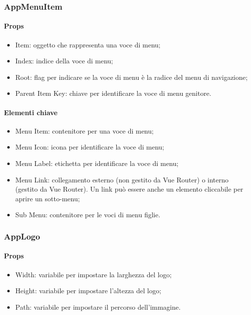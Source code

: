 \subsubsection{AppMenuItem}

\paragraph*{Props}
\begin{itemize}
  \item Item: oggetto che rappresenta una voce di menu;
  \item Index: indice della voce di menu;
  \item Root: flag per indicare se la voce di menu è la radice del menu di navigazione;
  \item Parent Item Key: chiave per identificare la voce di menu genitore.
\end{itemize}

\paragraph*{Elementi chiave}
\begin{itemize}
  \item Menu Item: contenitore per una voce di menu;
  \item Menu Icon: icona per identificare la voce di menu;
  \item Menu Label: etichetta per identificare la voce di menu;
  \item Menu Link: collegamento esterno (non gestito da Vue Router) o interno (gestito da Vue Router). Un link può essere anche un elemento cliccabile per aprire un sotto-menu;
  \item Sub Menu: contenitore per le voci di menu figlie.
\end{itemize}

\subsubsection{AppLogo}

\paragraph*{Props}
\begin{itemize}
  \item Width: variabile per impostare la larghezza del logo;
  \item Height: variabile per impostare l'altezza del logo;
  \item Path: variabile per impostare il percorso dell'immagine.
\end{itemize}

